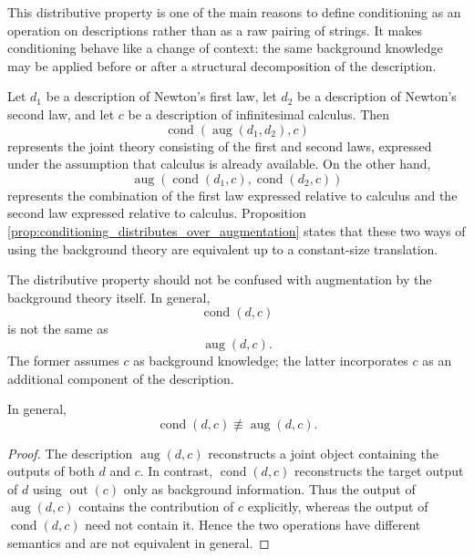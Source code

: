 This distributive property is one of the main reasons to define conditioning as
an operation on descriptions rather than as a raw pairing of strings. It makes
conditioning behave like a change of context: the same background knowledge may
be applied before or after a structural decomposition of the description.

\begin{example}
Let \(d_1\) be a description of Newton's first law, let \(d_2\) be a description
of Newton's second law, and let \(c\) be a description of infinitesimal
calculus. Then
\[
\operatorname{cond}(\operatorname{aug}(d_1,d_2),c)
\]
represents the joint theory consisting of the first and second laws, expressed
under the assumption that calculus is already available. On the other hand,
\[
\operatorname{aug}(\operatorname{cond}(d_1,c),
\operatorname{cond}(d_2,c))
\]
represents the combination of the first law expressed relative to calculus and
the second law expressed relative to calculus. Proposition
\ref{prop:conditioning_distributes_over_augmentation} states that these two
ways of using the background theory are equivalent up to a constant-size
translation.
\end{example}

The distributive property should not be confused with augmentation by the
background theory itself. In general,
\[
\operatorname{cond}(d,c)
\]
is not the same as
\[
\operatorname{aug}(d,c).
\]
The former assumes \(c\) as background knowledge; the latter incorporates \(c\)
as an additional component of the description.

\begin{proposition}
\label{prop:conditioning_not_augmentation}
In general,
\[
\operatorname{cond}(d,c)
\not\equiv
\operatorname{aug}(d,c).
\]
\end{proposition}

\begin{proof}
The description \(\operatorname{aug}(d,c)\) reconstructs a joint object
containing the outputs of both \(d\) and \(c\). In contrast,
\(\operatorname{cond}(d,c)\) reconstructs the target output of \(d\) using
\(\operatorname{out}(c)\) only as background information. Thus the output of
\(\operatorname{aug}(d,c)\) contains the contribution of \(c\) explicitly,
whereas the output of \(\operatorname{cond}(d,c)\) need not contain it. Hence
the two operations have different semantics and are not equivalent in general.
\end{proof}

